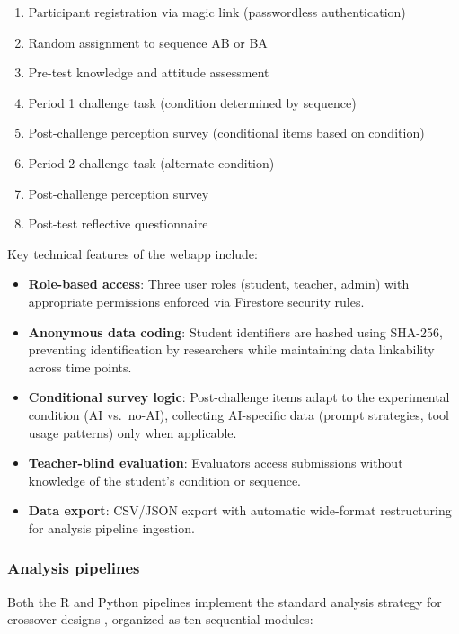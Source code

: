 \documentclass[authoryear,preprint,review,12pt]{elsarticle}
\begin{document}
\begin{enumerate}
    \item Participant registration via magic link (passwordless authentication)
    \item Random assignment to sequence AB or BA
    \item Pre-test knowledge and attitude assessment
    \item Period 1 challenge task (condition determined by sequence)
    \item Post-challenge perception survey (conditional items based on condition)
    \item Period 2 challenge task (alternate condition)
    \item Post-challenge perception survey
    \item Post-test reflective questionnaire
\end{enumerate}

Key technical features of the webapp include:
\begin{itemize}
    \item \textbf{Role-based access}: Three user roles (student, teacher, admin)
    with appropriate permissions enforced via Firestore security rules.
    \item \textbf{Anonymous data coding}: Student identifiers are hashed using
    SHA-256, preventing identification by researchers while maintaining data
    linkability across time points.
    \item \textbf{Conditional survey logic}: Post-challenge items adapt to the
    experimental condition (AI vs.\ no-AI), collecting AI-specific data
    (prompt strategies, tool usage patterns) only when applicable.
    \item \textbf{Teacher-blind evaluation}: Evaluators access submissions
    without knowledge of the student's condition or sequence.
    \item \textbf{Data export}: CSV/JSON export with automatic wide-format
    restructuring for analysis pipeline ingestion.
\end{itemize}

\subsubsection{Analysis pipelines}

Both the R and Python pipelines implement the standard analysis strategy for
crossover designs \citep{jones2014crossover}, organized as ten sequential
modules:
\end{document}
